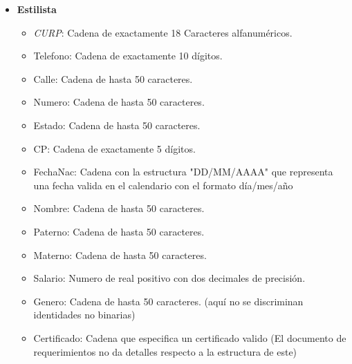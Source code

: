 \documentclass{exam}
\begin{document}
\begin{itemize}
	\item \textbf{Estilista}
		\begin{itemize}
			\item \textit{CURP}: Cadena de exactamente 18 Caracteres alfanuméricos.
			\item Telefono: Cadena de exactamente 10 dígitos.
			\item Calle: Cadena de hasta 50 caracteres.
			\item Numero: Cadena de hasta 50 caracteres.
			\item Estado: Cadena de hasta 50 caracteres.
			\item CP: Cadena de exactamente 5 dígitos.
			\item FechaNac: Cadena con la estructura "DD/MM/AAAA" que representa una fecha valida en el calendario con el formato día/mes/año
			\item Nombre: Cadena de hasta 50 caracteres.
			\item Paterno: Cadena de hasta 50 caracteres.
			\item Materno: Cadena de hasta 50 caracteres.
			\item Salario: Numero de real positivo con dos decimales de precisión.
			\item Genero: Cadena de hasta 50 caracteres. (aquí no se discriminan identidades no binarias)
			\item Certificado: Cadena que especifica un certificado valido (El documento de requerimientos no da detalles respecto a la estructura de este)
		\end{itemize}
		

\end{itemize}
\end{document}

